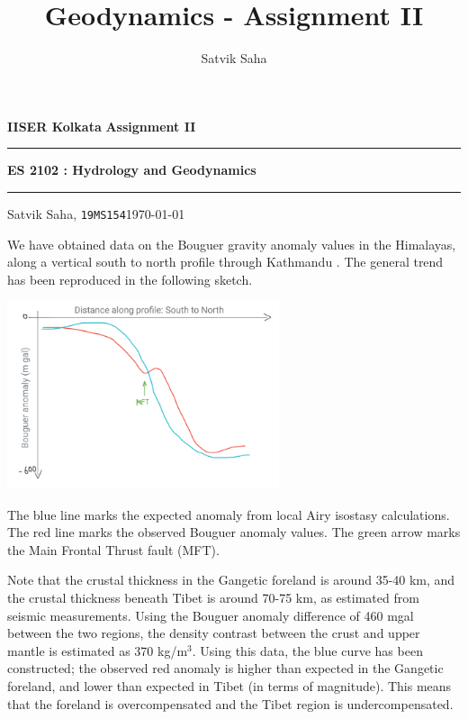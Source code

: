 \documentclass[10pt]{article}
\title{Geodynamics - Assignment II}
\author{Satvik Saha}
\date{}
\begin{document}
        \noindent\textbf{IISER Kolkata} \hfill \textbf{Assignment II}
        \vspace{3pt}
        \hrule
        \vspace{3pt}
        \begin{center}
                \LARGE{\textbf{ES 2102 : Hydrology and Geodynamics}}
        \end{center}
        \vspace{3pt}
        \hrule
        \vspace{3pt}
        Satvik Saha, \texttt{19MS154}\hfill\today
        \vspace{20pt}

        We have obtained data on the Bouguer gravity anomaly values in the Himalayas, along a vertical south to north profile through Kathmandu 
        \cite{gravity}. The general trend has been reproduced in the following sketch.
        \begin{center}
                \includegraphics[width=0.6\textwidth]{anomaly.png}
        \end{center}
        The blue line marks the expected anomaly from local Airy isostasy calculations. The red line marks the observed Bouguer anomaly values.
        The green arrow marks the Main Frontal Thrust fault (MFT).

        Note that the crustal thickness in the Gangetic foreland is around 35-40 km, and the crustal thickness beneath Tibet is around
        70-75 km, as estimated from seismic measurements. Using the Bouguer anomaly difference of 460 mgal between the two regions, 
        the density contrast between the crust and upper mantle is estimated as 370 kg/m$^3$.
        Using this data, the blue curve has been constructed; the observed red anomaly is higher than expected in the Gangetic foreland,
        and lower than expected in Tibet (in terms of magnitude). This means that the foreland is overcompensated and the Tibet
        region is undercompensated.
        
\end{document}

